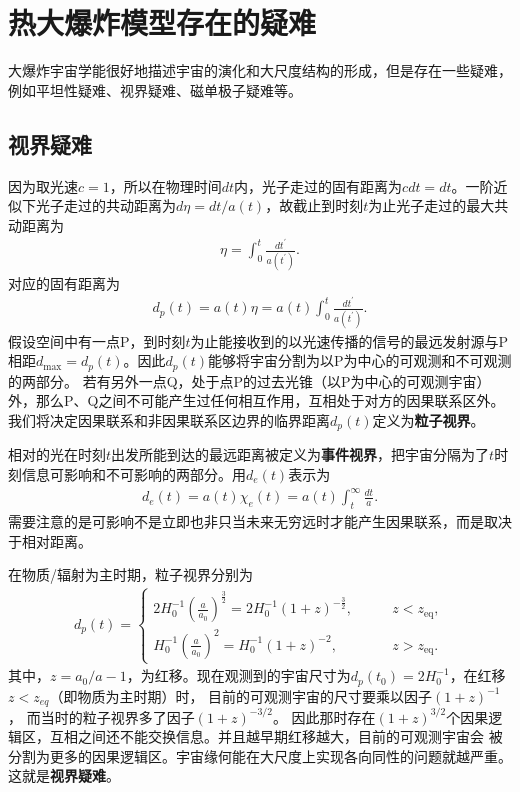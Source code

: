 \section{热大爆炸模型存在的疑难}
大爆炸宇宙学能很好地描述宇宙的演化和大尺度结构的形成，但是存在一些疑难，
例如平坦性疑难、视界疑难、磁单极子疑难等。

\subsection{视界疑难}
因为取光速$c=1$，所以在物理时间$dt$内，光子走过的固有距离为$cdt=dt$。一阶近似下光子走过的共动距离为$d\eta=dt
/a(t)$，故截止到时刻$t$为止光子走过的最大共动距离为
\begin{align}
  \label{eq:conformal_time}
  \eta = \int_0^{t} \frac{dt^{\prime}}{a(t^{\prime})}.
\end{align}
对应的固有距离为
\begin{align}
  \label{eq:particle_horizon}
  d_{p}(t) = a(t)\eta=a(t)\int_0^{t}\frac{dt^{\prime}}{a(t^{\prime})}.
\end{align}
假设空间中有一点P，到时刻$t$为止能接收到的以光速传播的信号的最远发射源与P相距$d_{\text{max}}=d_{p}(t)$。因此$d_{p}(t)$能够将宇宙分割为以P为中心的可观测和不可观测的两部分。
若有另外一点Q，处于点P的过去光锥（以P为中心的可观测宇宙）外，那么P、Q之间不可能产生过任何相互作用，互相处于对方的因果联系区外。我们将决定因果联系和非因果联系区边界的临界距离$d_{p}(t)$定义为\textbf{粒子视界}。

相对的光在时刻$t$出发所能到达的最远距离被定义为\textbf{事件视界}，把宇宙分隔为了$t$时刻信息可影响和不可影响的两部分。用$d_e(t)$表示为
\begin{align}
  d_e(t) = a(t)\chi_e(t) = a(t)\int_t^{\infty}\frac{dt}{a}.
\end{align}
需要注意的是可影响不是立即也非只当未来无穷远时才能产生因果联系，而是取决于相对距离。

在物质/辐射为主时期，粒子视界分别为
\begin{align}
  \label{eq:particle_horizon_matter}
  d_p(t) =
  \begin{cases}
    2H_0^{-1}{\left(\frac{a}{a_0}\right)}^{\frac{3}{2}} =
    2H_0^{-1}{\left(1+z\right)}^{-\frac{3}{2}},\qquad& z<z_{\text{eq}},\\
    H_0^{-1}{\left(\frac{a}{a_0}\right)}^2=H_0^{-1}{\left(1+z\right)}^{-2},\qquad&z>z_{\text{eq}}.
  \end{cases}
\end{align}
其中，$z=a_0 /a - 1$，为红移。现在观测到的宇宙尺寸为$d_p(t_0)=2H_0^{-1}$，在红移$z < z_{eq}$（即物质为主时期）时，
目前的可观测宇宙的尺寸要乘以因子${\left(1+z\right)}^{-1}$，
而当时的粒子视界多了因子${\left(1+z\right)}^{-3 /2}$。
因此那时存在${\left(1+z\right)}^{3/2}$个因果逻辑区，互相之间还不能交换信息。并且越早期红移越大，目前的可观测宇宙会
被分割为更多的因果逻辑区。宇宙缘何能在大尺度上实现各向同性的问题就越严重。这就是\textbf{视界疑难}。

